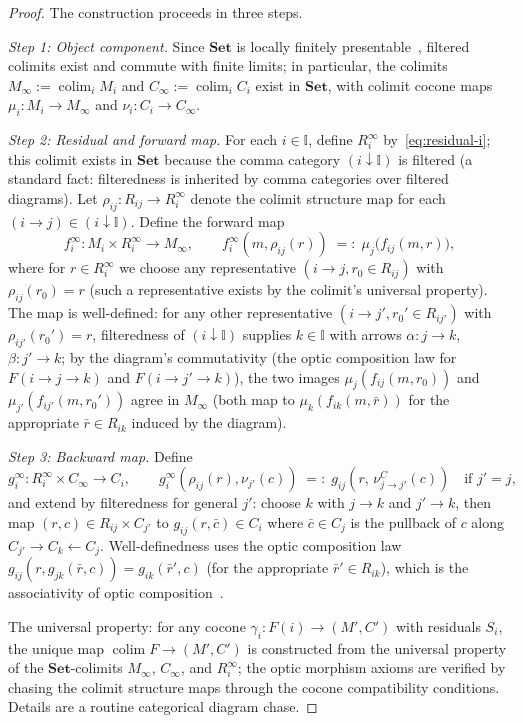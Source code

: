 \documentclass[11pt,a4paper]{article}
\theoremstyle{plain}
\theoremstyle{definition}
\theoremstyle{remark}
\newcommand{\colim}{\operatorname{colim}}
\begin{document}
\begin{proof}
The construction proceeds in three steps.

\noindent\textit{Step 1: Object component.} Since $\mathbf{Set}$ is
locally finitely presentable~\cite{adamek1994}, filtered colimits
exist and commute with finite limits; in particular, the colimits
$M_{\infty}:=\colim_{i}M_{i}$ and $C_{\infty}:=\colim_{i}C_{i}$ exist
in $\mathbf{Set}$, with colimit cocone maps
$\mu_{i}:M_{i}\to M_{\infty}$ and $\nu_{i}:C_{i}\to C_{\infty}$.

\noindent\textit{Step 2: Residual and forward map.} For each $i\in
\mathbb I$, define $R_{i}^{\infty}$ by~\eqref{eq:residual-i}; this
colimit exists in $\mathbf{Set}$ because the comma category
$(i\downarrow\mathbb I)$ is filtered (a standard fact: filteredness is
inherited by comma categories over filtered diagrams). Let
$\rho_{ij}:R_{ij}\to R_{i}^{\infty}$ denote the colimit structure map
for each $(i\to j)\in(i\downarrow\mathbb I)$. Define the forward map
\begin{equation*}
  f_{i}^{\infty}:M_{i}\times R_{i}^{\infty}\to M_{\infty},
  \qquad
  f_{i}^{\infty}(m,\rho_{ij}(r)) \;=:\; \mu_{j}\!\bigl(f_{ij}(m,r)\bigr),
\end{equation*}
where for $r\in R_{i}^{\infty}$ we choose any representative
$(i\to j,r_{0}\in R_{ij})$ with $\rho_{ij}(r_{0})=r$ (such a
representative exists by the colimit's universal property). The map is
well-defined: for any other representative $(i\to j',r_{0}'\in
R_{ij'})$ with $\rho_{ij'}(r_{0}')=r$, filteredness of
$(i\downarrow\mathbb I)$ supplies $k\in\mathbb I$ with arrows
$\alpha:j\to k$, $\beta:j'\to k$; by the diagram's commutativity
(the optic composition law for $F(i\to j\to k)$ and
$F(i\to j'\to k)$), the two images $\mu_{j}(f_{ij}(m,r_{0}))$ and
$\mu_{j'}(f_{ij'}(m,r_{0}'))$ agree in $M_{\infty}$ (both map to
$\mu_{k}(f_{ik}(m,\bar r))$ for the appropriate $\bar r\in R_{ik}$
induced by the diagram).

\noindent\textit{Step 3: Backward map.} Define
\begin{equation*}
  g_{i}^{\infty}:R_{i}^{\infty}\times C_{\infty}\to C_{i},
  \qquad
  g_{i}^{\infty}(\rho_{ij}(r),\nu_{j'}(c)) \;=:\;
  g_{ij}(r,\,\nu_{j\to j'}^{C}(c))\quad\text{if }j'=j,
\end{equation*}
and extend by filteredness for general $j'$: choose $k$ with $j\to k$
and $j'\to k$, then map $(r,c)\in R_{ij}\times C_{j'}$ to
$g_{ij}(r,\bar c)\in C_{i}$ where $\bar c\in C_{j}$ is the pullback
of $c$ along $C_{j'}\to C_{k}\leftarrow C_{j}$. Well-definedness uses
the optic composition law $g_{ij}(r,g_{jk}(\bar r,c))=
g_{ik}(\bar r',c)$ (for the appropriate $\bar r'\in R_{ik}$), which is
the associativity of optic composition~\cite[Prop.~2.3]{riley2018optics}.

The universal property: for any cocone
$\gamma_{i}:F(i)\to(M',C')$ with residuals $S_{i}$, the unique map
$\colim F\to(M',C')$ is constructed from the universal property of the
$\mathbf{Set}$-colimits $M_{\infty}$, $C_{\infty}$, and
$R_{i}^{\infty}$; the optic morphism axioms are verified by chasing
the colimit structure maps through the cocone compatibility conditions.
Details are a routine categorical diagram chase.
\end{proof}
\end{document}
